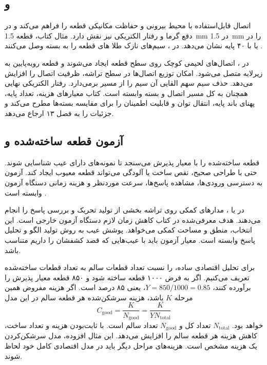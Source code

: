 \subsection{ و }
 اتصال قابل‌استفاده با محیط بیرونی و حفاظت مکانیکی قطعه را فراهم
می‌کند و در دفع گرما و رفتار الکتریکی نیز نقش دارد. مثال  کتاب، قطعه
\qty{1.5}{\milli\metre} در \qty{1.5}{\milli\metre} را در 
یا  با ۴۰ پایه نشان می‌دهد. در ، سیم‌های نازک طلا
های قطعه را به  بسته وصل می‌کنند
\cite[شکل  و صفحه ۵۵]{weste}.

در ، اتصال‌های لحیمی کوچک روی سطح قطعه ایجاد می‌شوند و قطعه
روبه‌پایین به زیرلایه متصل می‌شود. امکان توزیع اتصال‌ها در سطح تراشه، ظرفیت اتصال
را افزایش می‌دهد. حذف سیم  سهم القایی آن سیم را از مسیر برمی‌دارد.
رفتار الکتریکی نهایی همچنان به کل مسیر اتصال و بسته وابسته است.
کتاب معیارهای هزینه، تعداد پایه، پهنای باند پایه، انتقال توان و قابلیت اطمینان را
برای مقایسه بسته‌ها مطرح می‌کند و جزئیات را به فصل ۱۳ ارجاع می‌دهد.

\subsection{آزمون قطعه ساخته‌شده و }
 قطعه ساخته‌شده را با معیار پذیرش می‌سنجد تا نمونه‌های دارای عیب
شناسایی شوند. حتی با طراحی صحیح، نقص ساخت یا آلودگی می‌تواند قطعه معیوب ایجاد کند.
آزمون به دسترسی ورودی‌ها، مشاهده پاسخ‌ها، سرعت موردنظر و هزینه زمانی دستگاه
آزمون وابسته است \cite[صفحه ۵۵]{weste}.

در  یا ، مدارهای کمکی روی تراشه بخشی از تولید
تحریک و بررسی پاسخ را انجام می‌دهند. هدف معرفی‌شده در کتاب کاهش زمان لازم
دستگاه آزمون خارجی است. این انتخاب، منطق و مساحت کمکی می‌خواهد.
پوشش عیب به روش تولید الگو و تحلیل پاسخ وابسته است.
معیار آزمون باید با عیب‌هایی که قصد کشفشان را داریم متناسب باشد.

برای تحلیل اقتصادی ساده،  را نسبت تعداد قطعات سالم به تعداد قطعات
ساخته‌شده تعریف می‌کنیم. اگر به فرض ۱۰۰۰ قطعه ساخته شود و ۸۵۰ قطعه معیار پذیرش
را برآورده کنند، \(Y=850/1000=0.85\)، یعنی ۸۵ درصد است.
اگر هزینه مفروض همین مرحله \(K\) باشد، هزینه سرشکن‌شده هر قطعه سالم در این مدل
\begin{equation}
 C_{\mathrm{good}}=\frac{K}{N_{\mathrm{good}}}
 =\frac{K}{YN_{\mathrm{total}}}
 \label{eq:impl-yield-cost}
\end{equation}
خواهد بود. \(N_{\mathrm{total}}\) تعداد کل و \(N_{\mathrm{good}}\) تعداد سالم است.
با ثابت‌بودن هزینه و تعداد ساخت، کاهش  هزینه هر قطعه سالم را افزایش می‌دهد.
این مثال افزوده، مدل سرشکن‌کردن یک هزینه مشخص است. هزینه‌های مراحل دیگر باید
در مدل اقتصادی کامل خود لحاظ شوند.


